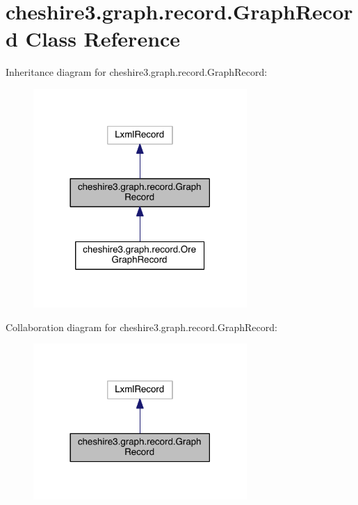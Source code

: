 \hypertarget{classcheshire3_1_1graph_1_1record_1_1_graph_record}{\section{cheshire3.\-graph.\-record.\-Graph\-Record Class Reference}
\label{classcheshire3_1_1graph_1_1record_1_1_graph_record}
}


Inheritance diagram for cheshire3.\-graph.\-record.\-Graph\-Record\-:
\nopagebreak
\begin{figure}[H]
\begin{center}
\leavevmode
\includegraphics[width=230pt]{classcheshire3_1_1graph_1_1record_1_1_graph_record__inherit__graph}
\end{center}
\end{figure}


Collaboration diagram for cheshire3.\-graph.\-record.\-Graph\-Record\-:
\nopagebreak
\begin{figure}[H]
\begin{center}
\leavevmode
\includegraphics[width=230pt]{classcheshire3_1_1graph_1_1record_1_1_graph_record__coll__graph}
\end{center}
\end{figure}
